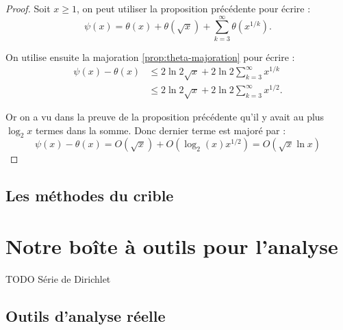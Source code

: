 \documentclass[french]{report}
\begin{document}
\begin{proof}
  Soit $x\geq1$, on peut utiliser la proposition précédente pour écrire :
  \[
    \psi(x)
    = \theta(x) + \theta(\sqrt{x})
    + \sum_{k=3}^{\infty}\theta(x^{1/k}).
  \]

  On utilise ensuite la majoration \ref{prop:theta-majoration} pour écrire :
  \begin{align*}
    \psi(x)-\theta(x)
    &\leq 2\ln2\sqrt{x}
    + 2\ln2\sum_{k=3}^{\infty}x^{1/k} \\
    &\leq 2\ln2\sqrt{x}
    + 2\ln2\sum_{k=3}^{\infty}x^{1/2}.
  \end{align*}

  Or on a vu dans la preuve de la proposition précédente qu'il y avait au plus $\log_2x$ termes dans la somme. Donc dernier terme est majoré par :
  \[
    \psi(x)-\theta(x)
    = O(\sqrt{x}) + O(\log_2(x)x^{1/2}) = O(\sqrt{x}\ln x)
  \]
\end{proof}

\section{Les méthodes du crible}

\chapter{Notre boîte à outils pour l'analyse}

TODO Série de Dirichlet

\section{Outils d'analyse réelle}
\end{document}
